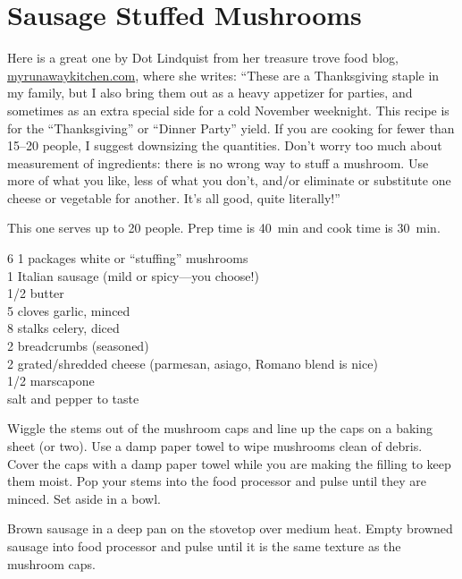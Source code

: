 \section{Sausage Stuffed Mushrooms}

\begin{open}
     Here is a great one by Dot Lindquist from her treasure trove food blog, \url{myrunawaykitchen.com},  where she  writes: ``These are a Thanksgiving staple in my family, but I also bring them out as a heavy appetizer for parties, and sometimes as an extra special side for a cold November weeknight.  This recipe is for the ``Thanksgiving'' or ``Dinner Party'' yield.  If you are cooking for fewer than \numrange{15}{20} people, I suggest downsizing the quantities.  Don’t worry too much about measurement of ingredients: there is no wrong way to stuff a mushroom.  Use more of what you like, less of what you don't, and/or eliminate or substitute one cheese or vegetable for another.  It's all good, quite literally!''

    This one serves up to 20 people.  Prep time is \SI{40}{\minute} and cook time is \SI{30}{\minute}.
\end{open}
\begin{ingredients}
    6 \SI{1}{\quart} packages white or ``stuffing'' mushrooms\\
    \SI{1}{\pound} Italian sausage (mild or spicy---you choose!)\\
    \SI{1/2}{\cup} butter\\
    5 cloves garlic, minced\\
    8 stalks celery, diced\\
    \SI{2}{\cup} breadcrumbs (seasoned)\\
    \SI{2}{\cup} grated/shredded cheese (parmesan, asiago, Romano blend is
    nice)\\
    \SI{1/2}{\cup} marscapone\\
    salt and pepper to taste
\end{ingredients}
Wiggle the stems out of the mushroom caps and line up the caps on a baking sheet
(or two). Use a damp paper towel to wipe mushrooms clean of debris. Cover the
caps with a damp paper towel while you are making the filling to keep them
moist. Pop your stems into the food processor and pulse until they are minced.
Set aside in a bowl.

Brown sausage in a deep pan on the stovetop over medium heat. Empty browned
sausage into food processor and pulse until it is the same texture as the
mushroom caps.


